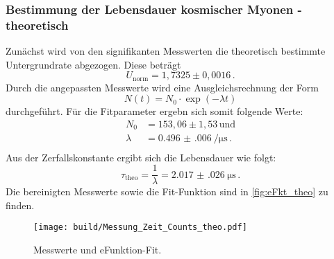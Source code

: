   \subsubsection{Bestimmung der Lebensdauer kosmischer Myonen - theoretisch}
    Zunächst wird von den signifikanten Messwerten die theoretisch bestimmte Untergrundrate abgezogen.
    Diese beträgt
    \begin{equation*}
      U_\text{norm} = 1,7325 \pm 0,0016 \, .
    \end{equation*}
    Durch die angepassten Messwerte wird eine Ausgleichsrechnung der Form
    \begin{equation*}
      N(t) = N_0 \cdot \exp(-\lambda t)
    \end{equation*}
    durchgeführt.
    Für die Fitparameter ergebn sich somit folgende Werte:
    \begin{align*}
      N_0 &= 153,06 \pm 1,53 \, \text{und}\\
      \lambda &= \SI{0.496(006)}{\per\micro\second} \, . \\
    \end{align*}
    Aus der Zerfallskonstante ergibt sich die Lebensdauer wie folgt:
    \begin{equation*}
      \tau_\text{theo} = \frac{1}{\lambda} = \SI{2.017(026)}{\micro\second} \, .
    \end{equation*}
    Die bereinigten Messwerte sowie die Fit-Funktion sind in \autoref{fig:eFkt_theo} zu finden.
    \begin{figure}
      \centering
      \texttt{[image: build/Messung\_Zeit\_Counts\_theo.pdf]}
      \caption{Messwerte und eFunktion-Fit.}
      \label{fig:eFkt_theo}
    \end{figure}